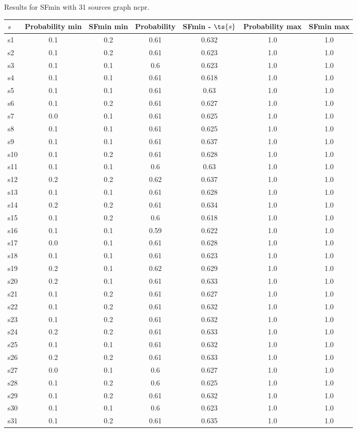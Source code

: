 \documentclass{article}
\begin{document}
\noindent Results for SFmin with 31 sources graph ncpr.

\noindent\begin{tabular}{|l|c|c|c|c|c|c|}
\hline
$s$& Probability min & SFmin min & Probability & SFmin - $\ts{s}$ & Probability max & SFmin max\\
\hline
s1 &0.1 & 0.2 & 0.61 & 0.632 & 1.0 & 1.0\\
\hline
s2 &0.1 & 0.2 & 0.61 & 0.623 & 1.0 & 1.0\\
\hline
s3 &0.1 & 0.1 & 0.6 & 0.623 & 1.0 & 1.0\\
\hline
s4 &0.1 & 0.1 & 0.61 & 0.618 & 1.0 & 1.0\\
\hline
s5 &0.1 & 0.1 & 0.61 & 0.63 & 1.0 & 1.0\\
\hline
s6 &0.1 & 0.2 & 0.61 & 0.627 & 1.0 & 1.0\\
\hline
s7 &0.0 & 0.1 & 0.61 & 0.625 & 1.0 & 1.0\\
\hline
s8 &0.1 & 0.1 & 0.61 & 0.625 & 1.0 & 1.0\\
\hline
s9 &0.1 & 0.1 & 0.61 & 0.637 & 1.0 & 1.0\\
\hline
s10 &0.1 & 0.2 & 0.61 & 0.628 & 1.0 & 1.0\\
\hline
s11 &0.1 & 0.1 & 0.6 & 0.63 & 1.0 & 1.0\\
\hline
s12 &0.2 & 0.2 & 0.62 & 0.637 & 1.0 & 1.0\\
\hline
s13 &0.1 & 0.1 & 0.61 & 0.628 & 1.0 & 1.0\\
\hline
s14 &0.2 & 0.2 & 0.61 & 0.634 & 1.0 & 1.0\\
\hline
s15 &0.1 & 0.2 & 0.6 & 0.618 & 1.0 & 1.0\\
\hline
s16 &0.1 & 0.1 & 0.59 & 0.622 & 1.0 & 1.0\\
\hline
s17 &0.0 & 0.1 & 0.61 & 0.628 & 1.0 & 1.0\\
\hline
s18 &0.1 & 0.1 & 0.61 & 0.623 & 1.0 & 1.0\\
\hline
s19 &0.2 & 0.1 & 0.62 & 0.629 & 1.0 & 1.0\\
\hline
s20 &0.2 & 0.1 & 0.61 & 0.633 & 1.0 & 1.0\\
\hline
s21 &0.1 & 0.2 & 0.61 & 0.627 & 1.0 & 1.0\\
\hline
s22 &0.1 & 0.2 & 0.61 & 0.632 & 1.0 & 1.0\\
\hline
s23 &0.1 & 0.2 & 0.61 & 0.632 & 1.0 & 1.0\\
\hline
s24 &0.2 & 0.2 & 0.61 & 0.633 & 1.0 & 1.0\\
\hline
s25 &0.1 & 0.1 & 0.61 & 0.632 & 1.0 & 1.0\\
\hline
s26 &0.2 & 0.2 & 0.61 & 0.633 & 1.0 & 1.0\\
\hline
s27 &0.0 & 0.1 & 0.6 & 0.627 & 1.0 & 1.0\\
\hline
s28 &0.1 & 0.2 & 0.6 & 0.625 & 1.0 & 1.0\\
\hline
s29 &0.1 & 0.2 & 0.61 & 0.632 & 1.0 & 1.0\\
\hline
s30 &0.1 & 0.1 & 0.6 & 0.623 & 1.0 & 1.0\\
\hline
s31 &0.1 & 0.2 & 0.61 & 0.635 & 1.0 & 1.0\\
\hline
\end{tabular}\\
\end{document}
